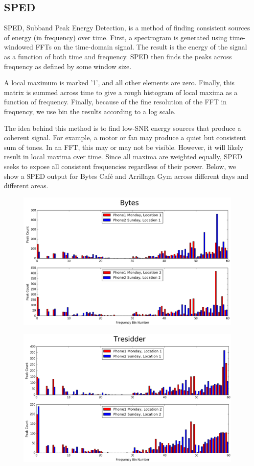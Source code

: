 \documentclass[journal]{IEEEtran}
\begin{document}
\subsection{SPED}
SPED, Subband Peak Energy Detection, is a method of finding consistent sources of energy (in frequency) over time. First, a spectrogram is generated using time-windowed FFTs on the time-domain signal. The result is the energy of the signal as a function of both time and frequency. SPED then finds the peaks across frequency as defined by some window size. 

A local maximum is marked '1', and all other elements are zero. Finally, this matrix is summed across time to give a rough histogram of local maxima as a function of frequency. Finally, because of the fine resolution of the FFT in frequency, we use bin the results according to a log scale.

The idea behind this method is to find low-SNR energy sources that produce a coherent signal. For example, a motor or fan may produce a quiet but consistent sum of tones. In an FFT, this may or may not be visible. However, it will likely result in local maxima over time. Since all maxima are weighted equally, SPED seeks to expose all consistent frequencies regardless of their power. Below, we show a SPED output for Bytes Caf\'e and Arrillaga Gym across different days and different areas. 
\begin{figure}[H]
	\centering
	\includegraphics[width=0.9\linewidth]{bytes_sped}
\end{figure}
\begin{figure}[H]
	\centering
	\includegraphics[width=0.9\linewidth]{tressider_sped}
\end{figure}
\end{document}
